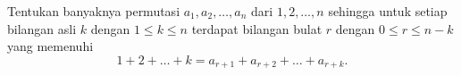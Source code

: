 Tentukan banyaknya permutasi $a_1, a_2, \dots, a_n$ dari $1,2,\dots,n$ sehingga untuk setiap bilangan asli $k$ dengan $1 \le k \le n$ terdapat bilangan bulat $r$ dengan $0 \le r \le n-k$ yang memenuhi
$$1+2+\dots+k = a_{r+1}+a_{r+2}+\dots+a_{r+k}.$$